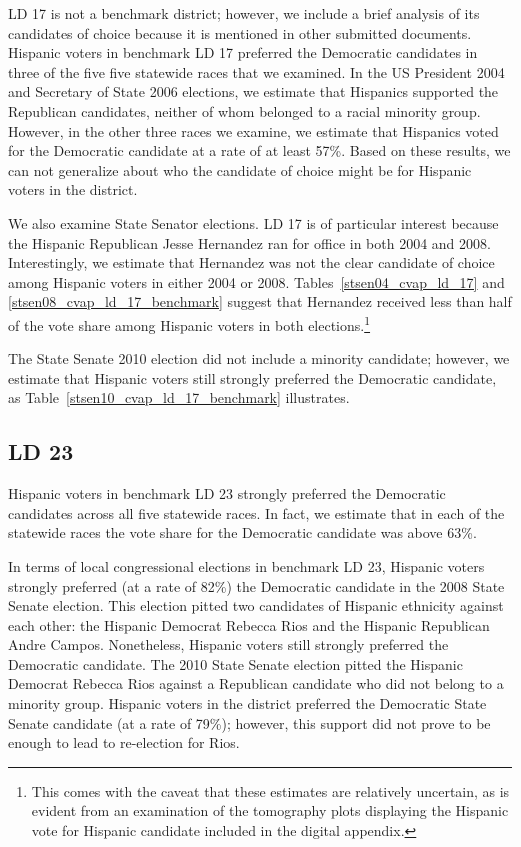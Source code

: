 \documentclass[12pt]{article}
\begin{document}
LD 17 is not a benchmark district; however, we include a brief analysis of its candidates of choice because it is mentioned in other submitted documents. 
Hispanic voters in benchmark LD 17 preferred the Democratic candidates in three of the five five statewide races that we examined. In the US President 2004 and Secretary of State 2006 elections, we estimate that Hispanics supported the Republican candidates, neither of whom belonged to a racial minority group. However, in the other three races we examine, we estimate that Hispanics voted for the Democratic candidate at a rate of at least 57\%. Based on these results, we can not generalize about who the candidate of choice might be for Hispanic voters in the district.

We also examine State Senator elections. LD 17 is of particular interest because the Hispanic Republican Jesse Hernandez ran for office in both 2004 and 2008. Interestingly, we estimate that Hernandez was not the clear candidate of choice among Hispanic voters in either 2004 or 2008. Tables~\ref{stsen04_cvap_ld_17} and \ref{stsen08_cvap_ld_17_benchmark} suggest that Hernandez received less than half of the vote share among Hispanic voters in both elections.\footnote{This comes with the caveat that these estimates are relatively uncertain, as is evident from an examination of the tomography plots displaying the Hispanic vote for Hispanic candidate included in the digital appendix.}

The State Senate 2010 election did not include a minority candidate; however, we estimate that Hispanic voters still strongly preferred the Democratic candidate, as Table~\ref{stsen10_cvap_ld_17_benchmark} illustrates. 

\subsection{LD 23}

Hispanic voters in benchmark LD 23 strongly preferred the Democratic candidates across all five statewide races. In fact, we estimate that in each of the statewide races the vote share for the Democratic candidate was above 63\%. 

In terms of local congressional elections in benchmark LD 23, Hispanic voters strongly preferred (at a rate of 82\%)
the Democratic candidate in the 2008 State Senate election. This election pitted two 
candidates of Hispanic ethnicity against each other: the Hispanic Democrat Rebecca Rios
and the Hispanic Republican Andre Campos. Nonetheless, Hispanic voters still strongly preferred the Democratic candidate. 
The 2010 State Senate election pitted the Hispanic Democrat Rebecca Rios against a Republican candidate who did not belong to a minority group. Hispanic voters in the district preferred the Democratic State Senate candidate (at a rate of 79\%); however, this support did not prove to be enough to lead to re-election for Rios.
\end{document}
